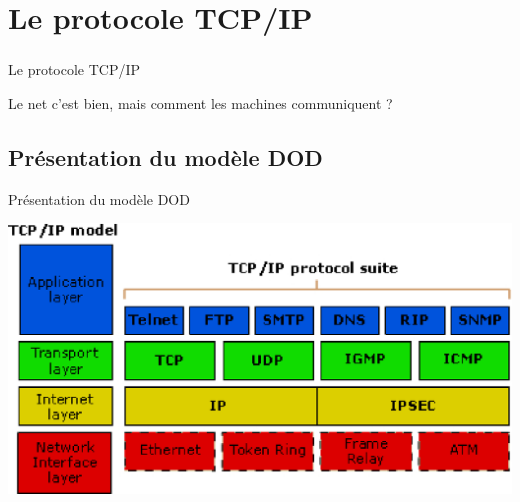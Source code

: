 




\section{Le protocole TCP/IP}
\begin{frame}\frametitle{}
    {\Huge Le protocole TCP/IP}

    \vspace{2em}

    Le net c'est bien, mais comment les machines communiquent ?
\end{frame}


\begin{frame}\frametitle{}
    \subsection{Présentation du modèle DOD}
    {\Huge Présentation du modèle DOD}

    \includegraphics[scale=0.75]{res/DodModel.eps}

\end{frame}


